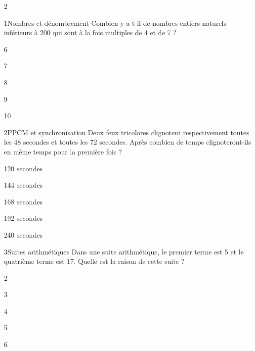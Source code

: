

\newcommand{\titrechapitre}{Sujet type Sésame}
\newcommand{\numerochapitre}{1}

\renewcommand{\headrulewidth}{0.4pt}
\renewcommand{\footrulewidth}{0.4pt}
\fancyfoot[C]{\thepage}
\fancyhead[R]{\titrechapitre}




\begin{multicols}{2}

\begin{question}{1}{Nombres et dénombrement}
Combien y a-t-il de nombres entiers naturels inférieurs à 200 qui sont à la fois multiples de 4 et de 7 ?
\begin{enumeratebf}
\item 6
\item 7
\item 8
\item 9
\item 10
\end{enumeratebf}
\end{question}

\begin{question}{2}{PPCM et synchronisation}
Deux feux tricolores clignotent respectivement toutes les 48 secondes et toutes les 72 secondes. Après combien de temps clignoteront-ils en même temps pour la première fois ?
\begin{enumeratebf}
\item 120 secondes
\item 144 secondes
\item 168 secondes
\item 192 secondes
\item 240 secondes
\end{enumeratebf}
\end{question}

\begin{question}{3}{Suites arithmétiques}
Dans une suite arithmétique, le premier terme est 5 et le quatrième terme est 17. Quelle est la raison de cette suite ?
\begin{enumeratebf}
\item 2
\item 3
\item 4
\item 5
\item 6
\end{enumeratebf}
\end{question}


\end{multicols}
